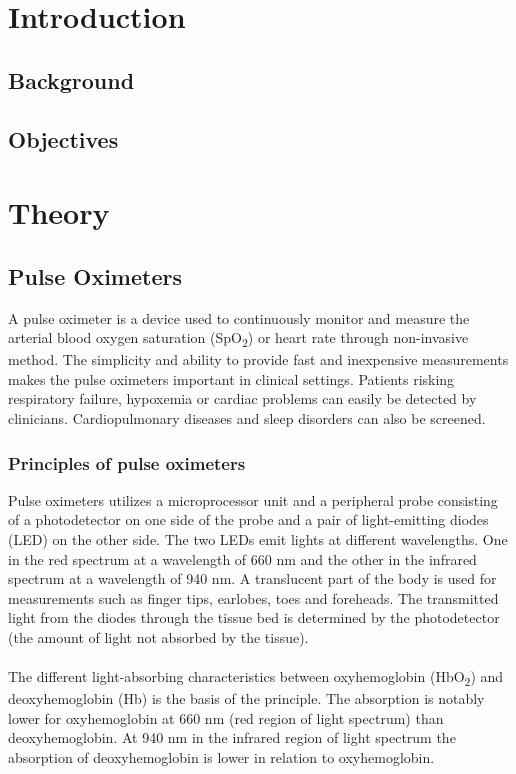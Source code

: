 \documentclass{report}
\begin{document}
  \tableofcontents



\chapter{Introduction}

 \vspace{-0.6cm}
\section{Background}
 


\section{Objectives}



\chapter{Theory}

 \vspace{-0.6cm}
\section{Pulse Oximeters}


A pulse oximeter is a device used to continuously monitor and measure the arterial blood oxygen saturation (SpO\textsubscript{2}) or heart rate through non-invasive method. The simplicity and ability to provide fast and inexpensive measurements makes the pulse oximeters important in clinical settings. Patients risking respiratory failure, hypoxemia or cardiac problems can easily be detected by clinicians. Cardiopulmonary diseases and sleep disorders can also be screened. 
 
\subsection{Principles of pulse oximeters}
Pulse oximeters utilizes a microprocessor unit and a peripheral probe consisting of a photodetector on one side of the probe and a pair of light-emitting diodes (LED) on the other side. The two LEDs emit lights at different wavelengths. One in the red spectrum at a wavelength of 660 nm and the other in the infrared spectrum at a wavelength of 940 nm. A translucent part of the body is used for measurements such as finger tips, earlobes, toes and foreheads. The transmitted light from the diodes through the tissue bed is determined by the photodetector (the amount of light not absorbed by the tissue). 
\\
\\
The different light-absorbing characteristics between oxyhemoglobin (HbO\textsubscript{2}) and deoxyhemoglobin (Hb) is the basis of the principle. The absorption is notably lower for oxyhemoglobin at 660 nm (red region of light spectrum) than deoxyhemoglobin. At 940 nm in the infrared region of light spectrum the absorption of deoxyhemoglobin is lower in relation to oxyhemoglobin.
\end{document}
